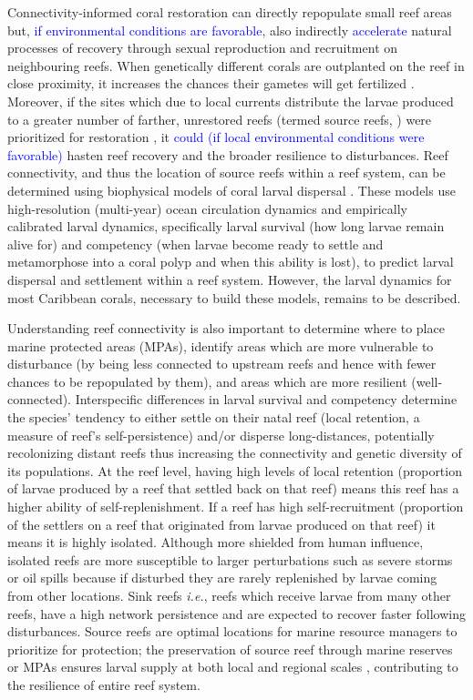 \documentclass[preprint,12pt,authoryear]{elsarticle}
\newcommand{\modif}[1]{\textcolor{blue}{#1}}
\begin{document}
	Connectivity-informed coral restoration can directly repopulate small reef areas but, \modif{if environmental conditions are favorable}, also indirectly \modif{accelerate} natural processes of recovery through sexual reproduction and recruitment on neighbouring reefs. When genetically different corals are outplanted on the reef in close proximity, it increases the chances their gametes will get fertilized \citep{omori2019coral}. Moreover, if the sites which due to local currents distribute the larvae produced to a greater number of farther, unrestored reefs (termed source reefs, \citealp{bode2018resilient}) were prioritized for restoration \citep{king2023larval}, it \modif{could (if local environmental conditions were favorable)} hasten reef recovery and the broader resilience to disturbances. Reef connectivity, and thus the location of source reefs within a reef system, can be determined using biophysical models of coral larval dispersal \citep{frys2020fine, figueiredo2022global,king2023larval}. These models use high-resolution (multi-year) ocean circulation dynamics and empirically calibrated larval dynamics, specifically larval survival (how long larvae remain alive for) and competency (when larvae become ready to settle and metamorphose into a coral polyp and when this ability is lost), to predict larval dispersal and settlement within a reef system. However, the larval dynamics for most Caribbean corals, necessary to build these models, remains to be described.
	
	Understanding reef connectivity is also important to determine where to place marine protected areas (MPAs), identify areas which are more vulnerable to disturbance (by being less connected to upstream reefs and hence with fewer chances to be repopulated by them), and areas which are more resilient (well-connected). Interspecific differences in larval survival and competency determine the species’ tendency to either settle on their natal reef (local retention, a measure of reef’s self-persistence) and/or disperse long-distances, potentially recolonizing distant reefs thus increasing the connectivity and genetic diversity of its populations. At the reef level, having high levels of local retention (proportion of larvae produced by a reef that settled back on that reef) means this reef has a higher ability of self-replenishment. If a reef has high self-recruitment (proportion of the settlers on a reef that originated from larvae produced on that reef) it means it is highly isolated.  Although more shielded from human influence, isolated reefs are more susceptible to larger perturbations such as severe storms or oil spills \citep{baumann2022remoteness} because if disturbed they are rarely replenished by larvae coming from other locations. Sink reefs \textit{i.e.}, reefs which receive larvae from many other reefs, have a high network persistence and are expected to recover faster following disturbances. Source reefs are optimal locations for marine resource managers to prioritize for protection; the preservation of source reef through marine reserves or MPAs ensures larval supply at both local and regional scales \citep{muenzel2023integrating}, contributing to the resilience of entire reef system.
	
\end{document}
